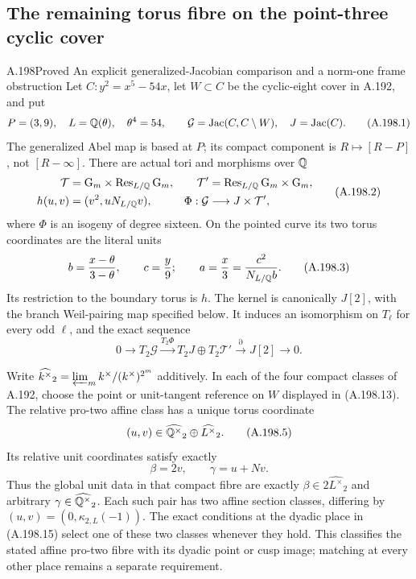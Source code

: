 \subsection{The remaining torus fibre on the point-three cyclic cover}

\begin{statement}{A.198}{Proved}
{An explicit generalized-Jacobian comparison and a norm-one frame obstruction}
Let \(C:y^2=x^5-54x\), let \(W\subset C\) be the cyclic-eight
cover in A.192, and put
\[
 P=(3,9),\quad L=\mathbb Q(\theta),\quad\theta^4=54,\qquad
 \mathcal G=\operatorname{Jac}(C,C\setminus W),\quad J=\operatorname{Jac}(C).
\tag{A.198.1}
\]
The generalized Abel map is based at \(P\); its compact component
is \(R\mapsto[R-P]\), not \([R-\infty]\).
There are actual tori and morphisms over \(\mathbb Q\)
\[
\begin{aligned}
 \mathcal T&=\mathrm G_m\times\operatorname{Res}_{L/\mathbb Q}\mathrm G_m,
 &\mathcal T'&=\operatorname{Res}_{L/\mathbb Q}\mathrm G_m\times\mathrm G_m,\\
 h(u,v)&=(v^2,uN_{L/\mathbb Q}v),
 &\Phi:\mathcal G&\longrightarrow J\times\mathcal T',
\end{aligned}
\tag{A.198.2}
\]
where \(\Phi\) is an isogeny of degree sixteen.  On the pointed
curve its two torus coordinates are the literal units
\[
 b=\frac{x-\theta}{3-\theta},\qquad c=\frac y9;
 \qquad a=\frac x3=\frac{c^2}{N_{L/\mathbb Q}b}.
\tag{A.198.3}
\]
Its restriction to the boundary torus is \(h\).
The kernel is canonically \(J[2]\), with the branch Weil-pairing
map specified below.  It induces an isomorphism on \(T_\ell\)
for every odd \(\ell\), and the exact sequence
\[
 0\longrightarrow T_2\mathcal G\xrightarrow{T_2\Phi}
 T_2J\oplus T_2\mathcal T'\xrightarrow{\partial}J[2]
 \longrightarrow0.
\tag{A.198.4}
\]

Write \(\widehat{k^\times}_2=\varprojlim_m k^\times/(k^\times)^{2^m}\)
additively.  In each of the four compact classes of A.192, choose the
point or unit-tangent reference on \(W\) displayed in (A.198.13).
The relative pro-two affine class has a unique torus coordinate
\[
 (u,v)\in\widehat{\mathbb Q^\times}_2\oplus\widehat{L^\times}_2.
\tag{A.198.5}
\]
Its relative unit coordinates satisfy exactly
\[
                   \beta=2v,\qquad\gamma=u+Nv.
\tag{A.198.6}
\]
Thus the global unit data in that compact fibre are exactly
\(\beta\in2\widehat{L^\times}_2\) and arbitrary
\(\gamma\in\widehat{\mathbb Q^\times}_2\).  Each such pair has two
affine section classes, differing by
\((u,v)=(0,\kappa_{2,L}(-1))\).  The exact conditions at the
dyadic place in (A.198.15) select one of these two classes whenever
they hold.  This classifies the stated affine pro-two fibre with its
dyadic point or cusp image; matching at every other place remains a
separate requirement.


\end{statement}
